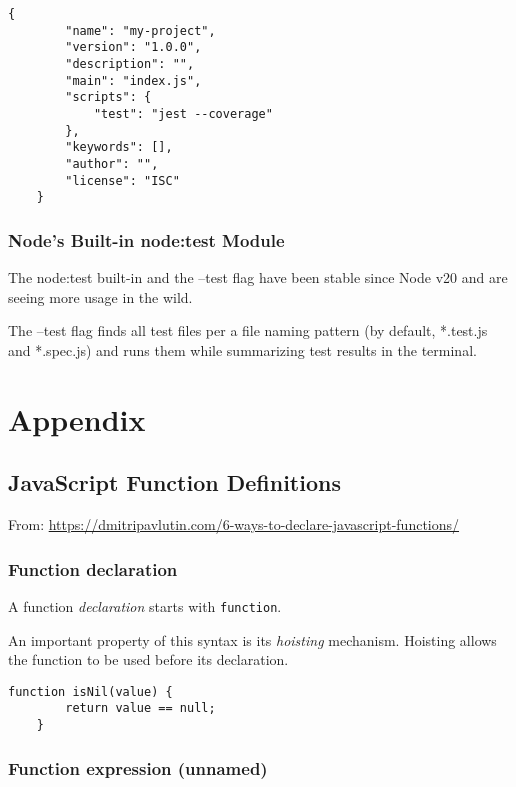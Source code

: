 \documentclass{scrartcl}
\begin{document}
\begin{lstlisting}[style=ES6]
    {
        "name": "my-project",
        "version": "1.0.0",
        "description": "",
        "main": "index.js",
        "scripts": {
            "test": "jest --coverage"
        },
        "keywords": [],
        "author": "",
        "license": "ISC"
    }
\end{lstlisting}

\subsubsection{Node's Built-in node:test Module}

The node:test built-in and the --test flag have been stable since Node v20 and are seeing more usage in the wild.

The --test flag finds all test files per a file naming pattern (by default, *.test.js and *.spec.js) and runs them while summarizing test results in the terminal.

\section{Appendix}

\subsection{JavaScript Function Definitions}

From:  \url{https://dmitripavlutin.com/6-ways-to-declare-javascript-functions/}

\subsubsection{Function declaration}

A function \textit{declaration} starts with \lstinline|function|.

An important property of this syntax is its \textit{hoisting} mechanism. Hoisting allows the function to be used before its declaration.

\begin{lstlisting}[style=ES6]
    function isNil(value) {
        return value == null;
    }
\end{lstlisting}

\subsubsection{Function expression (unnamed)}
\end{document}
